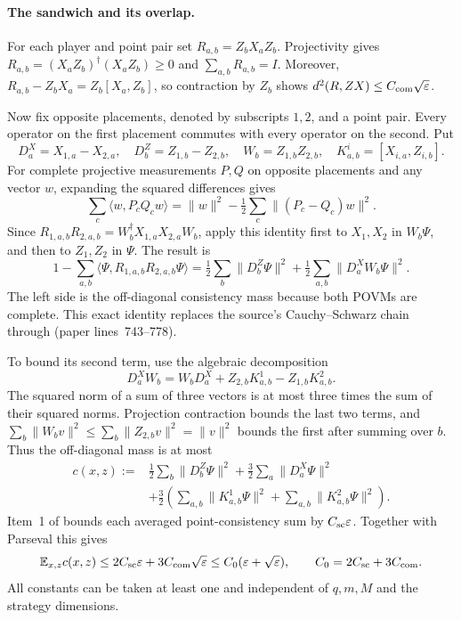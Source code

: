 \documentclass[11pt]{article}
\begin{document}
\paragraph{The sandwich and its overlap.}
For each player and point pair set $R_{a,b}=Z_bX_aZ_b$.
Projectivity gives $R_{a,b}=(X_aZ_b)^\dagger(X_aZ_b)\geq0$ and
$\sum_{a,b}R_{a,b}=I$.  Moreover,
$R_{a,b}-Z_bX_a=Z_b[X_a,Z_b]$, so contraction by $Z_b$ shows
$d^2(R,ZX)\leq C_{\rm com}\sqrt\varepsilon$.

Now fix opposite placements, denoted by subscripts $1,2$, and a point pair.
Every operator on the first placement commutes with every operator on the
second.  Put
\[
 D^X_a=X_{1,a}-X_{2,a},\quad D^Z_b=Z_{1,b}-Z_{2,b},\quad
 W_b=Z_{1,b}Z_{2,b},\quad K^i_{a,b}=[X_{i,a},Z_{i,b}].
\]
For complete projective measurements $P,Q$ on opposite placements and any
vector $w$, expanding the squared differences gives
\[
 \sum_c\langle w,P_cQ_cw\rangle
 =\|w\|^2-\tfrac12\sum_c\|(P_c-Q_c)w\|^2.
\]
Since $R_{1,a,b}R_{2,a,b}=W_b^\dagger X_{1,a}X_{2,a}W_b$, apply this identity
first to $X_1,X_2$ in $W_b\Psi$, and then to $Z_1,Z_2$ in $\Psi$.  The result is
\[
 1-\sum_{a,b}\langle\Psi,R_{1,a,b}R_{2,a,b}\Psi\rangle
 =\tfrac12\sum_b\|D^Z_b\Psi\|^2
   +\tfrac12\sum_{a,b}\|D^X_aW_b\Psi\|^2.
\]
The left side is the off-diagonal consistency mass because both POVMs are
complete.  This exact identity replaces the source's Cauchy--Schwarz chain
 through 
(paper lines~743--778).

To bound its second term, use the algebraic decomposition
\[
 D^X_aW_b=W_bD^X_a+Z_{2,b}K^1_{a,b}-Z_{1,b}K^2_{a,b}.
\]
The squared norm of a sum of three vectors is at most three times the sum
of their squared norms.  Projection contraction bounds the last two terms,
and $\sum_b\|W_bv\|^2\leq\sum_b\|Z_{2,b}v\|^2=\|v\|^2$ bounds the first
after summing over $b$.  Thus the off-diagonal mass is at most
\[
 \begin{aligned}
 c(x,z):={}&\tfrac12\sum_b\|D^Z_b\Psi\|^2
       +\tfrac32\sum_a\|D^X_a\Psi\|^2\\
   &+\tfrac32\left(\sum_{a,b}\|K^1_{a,b}\Psi\|^2
       +\sum_{a,b}\|K^2_{a,b}\Psi\|^2\right).
 \end{aligned}
\]
Item~1 of  bounds each averaged point-consistency
sum by $C_{\rm sc}\varepsilon$.  Together with Parseval this gives
\[
 \mathbb E_{x,z}c(x,z)\leq
 2C_{\rm sc}\varepsilon+3C_{\rm com}\sqrt\varepsilon
 \leq C_0(\varepsilon+\sqrt\varepsilon),
 \qquad C_0=2C_{\rm sc}+3C_{\rm com}.
\]
All constants can be taken at least one and independent of $q,m,M$ and the
strategy dimensions.
\end{document}
